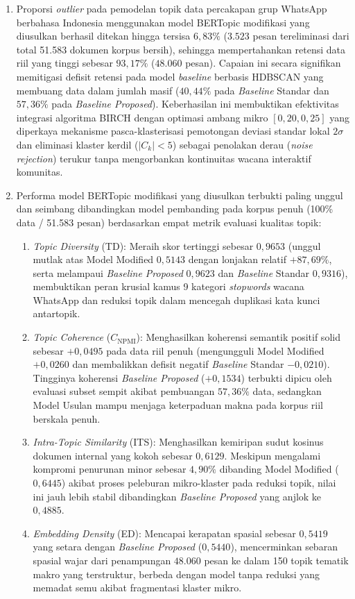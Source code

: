 \begin{enumerate}
    \item Proporsi \textit{outlier} pada pemodelan topik data percakapan grup WhatsApp berbahasa Indonesia menggunakan model BERTopic modifikasi yang diusulkan berhasil ditekan hingga tersisa $6{,}83\%$ ($3.523$ pesan tereliminasi dari total 51.583 dokumen korpus bersih), sehingga mempertahankan retensi data riil yang tinggi sebesar $93{,}17\%$ ($48.060$ pesan). Capaian ini secara signifikan memitigasi defisit retensi pada model \textit{baseline} berbasis HDBSCAN yang membuang data dalam jumlah masif ($40{,}44\%$ pada \textit{Baseline} Standar dan $57{,}36\%$ pada \textit{Baseline Proposed}). Keberhasilan ini membuktikan efektivitas integrasi algoritma BIRCH dengan optimasi ambang mikro $[0{,}20, 0{,}25]$ yang diperkaya mekanisme pasca-klasterisasi pemotongan deviasi standar lokal $2\sigma$ dan eliminasi klaster kerdil ($|C_k| < 5$) sebagai penolakan derau (\textit{noise rejection}) terukur tanpa mengorbankan kontinuitas wacana interaktif komunitas.

    \item Performa model BERTopic modifikasi yang diusulkan terbukti paling unggul dan seimbang dibandingkan model pembanding pada korpus penuh (100\% data / 51.583 pesan) berdasarkan empat metrik evaluasi kualitas topik:
    \begin{enumerate}[label=\alph*., leftmargin=*, itemsep=2pt]
        \item \textit{Topic Diversity} (TD): Meraih skor tertinggi sebesar $0{,}9653$ (unggul mutlak atas Model Modified $0{,}5143$ dengan lonjakan relatif $+87{,}69\%$, serta melampaui \textit{Baseline Proposed} $0{,}9623$ dan \textit{Baseline} Standar $0{,}9316$), membuktikan peran krusial kamus 9 kategori \textit{stopwords} wacana WhatsApp dan reduksi topik dalam mencegah duplikasi kata kunci antartopik.
        \item \textit{Topic Coherence} ($C_{\text{NPMI}}$): Menghasilkan koherensi semantik positif solid sebesar $+0{,}0495$ pada data riil penuh (mengungguli Model Modified $+0{,}0260$ dan membalikkan defisit negatif \textit{Baseline} Standar $-0{,}0210$). Tingginya koherensi \textit{Baseline Proposed} ($+0{,}1534$) terbukti dipicu oleh evaluasi subset sempit akibat pembuangan $57{,}36\%$ data, sedangkan Model Usulan mampu menjaga keterpaduan makna pada korpus riil berskala penuh.
        \item \textit{Intra-Topic Similarity} (ITS): Menghasilkan kemiripan sudut kosinus dokumen internal yang kokoh sebesar $0{,}6129$. Meskipun mengalami kompromi penurunan minor sebesar $4{,}90\%$ dibanding Model Modified ($0{,}6445$) akibat proses peleburan mikro-klaster pada reduksi topik, nilai ini jauh lebih stabil dibandingkan \textit{Baseline Proposed} yang anjlok ke $0{,}4885$.
        \item \textit{Embedding Density} (ED): Mencapai kerapatan spasial sebesar $0{,}5419$ yang setara dengan \textit{Baseline Proposed} ($0{,}5440$), mencerminkan sebaran spasial wajar dari penampungan $48.060$ pesan ke dalam 150 topik tematik makro yang terstruktur, berbeda dengan model tanpa reduksi yang memadat semu akibat fragmentasi klaster mikro.
    \end{enumerate}


\end{enumerate}
